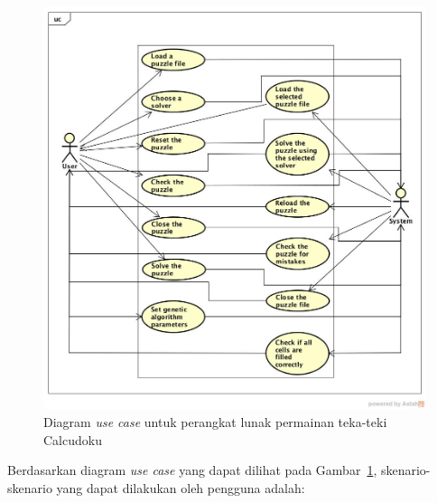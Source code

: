 \begin{figure}
\centering
\captionsetup{justification=centering}
\includegraphics[scale=0.4]{Gambar/Analisis/DiagramUseCase}
\caption[Diagram \textit{use case} untuk perangkat lunak permainan teka-teki Calcudoku]{Diagram \textit{use case} untuk perangkat lunak permainan teka-teki Calcudoku}
\label{fig:analisisusecase}
\end{figure}

Berdasarkan diagram \textit{use case} yang dapat dilihat pada Gambar~\ref{fig:analisisusecase}, skenario-skenario yang dapat dilakukan oleh pengguna adalah:

